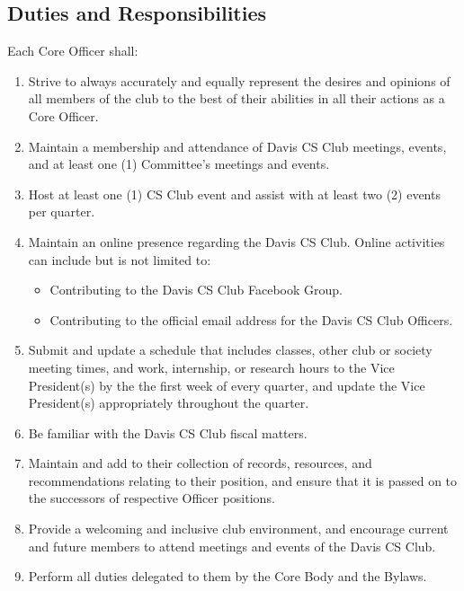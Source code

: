 \documentclass{article}
\newenvironment{li}{
\begin{enumerate}
  \setlength{\itemsep}{1pt}
  \setlength{\parskip}{0pt}
  \setlength{\parsep}{0pt}
}{\end{enumerate}}
\begin{document}
\subsection{Duties and Responsibilities}
Each Core Officer shall:
\begin{li}
\item Strive to always accurately and equally represent the desires and opinions of all members of the club to the best of their abilities in all their actions as a Core Officer.
\item Maintain a membership and attendance of Davis CS Club meetings, events, and at least one (1) Committee's meetings and events.
\item Host at least one (1) CS Club event and assist with at least two (2) events per quarter.
\item Maintain an online presence regarding the Davis CS Club. Online activities can include but is not limited to:
	\begin{itemize}
	  \setlength{\itemsep}{1pt}
	  \setlength{\parskip}{0pt}
	  \setlength{\parsep}{0pt}
	\item Contributing to the Davis CS Club Facebook Group.
	\item Contributing to the official email address for the Davis CS Club Officers.
	\end{itemize}
\item Submit and update a schedule that includes classes, other club or society meeting times, and work, internship, or research hours to the Vice President(s) by the the first week of every quarter, and update the Vice President(s) appropriately throughout the quarter.
\item Be familiar with the Davis CS Club fiscal matters.
\item Maintain and add to their collection of records, resources, and recommendations relating to their position, and ensure that it is passed on to the successors of respective Officer positions.
\item Provide a welcoming and inclusive club environment, and encourage current and future members to attend meetings and events of the Davis CS Club.
\item Perform all duties delegated to them by the Core Body and the Bylaws.
\end{li}
\end{document}
